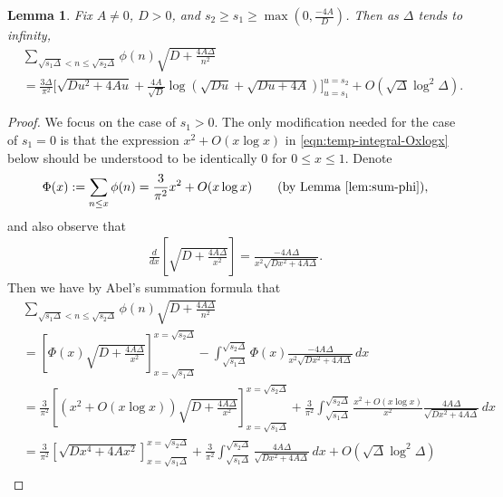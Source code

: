 \documentclass[11pt,letterpaper,reqno]{amsart}
\newtheorem{lemma}[theorem]{Lemma}
\numberwithin{equation}{section}
\numberwithin{figure}{section}
\numberwithin{table}{section}
\newcommand{\lrp}[1]{\left(#1\right)}
\newcommand{\lrb}[1]{\left[#1\right]}
\begin{document}
\begin{lemma}
    \label{lem:sum-phi-sqrt}
    Fix $A \ne 0$, $D > 0$, and $s_2 \ge s_1 \ge \max(0, \frac{-4A}{D})$. Then as $\Delta$ tends to infinity,
    \begin{align}
        &\sum_{ \sqrt{s_1 \Delta} < n \le \sqrt{s_2 \Delta} }
        \phi(n)  
        \sqrt{D+\frac{4A\Delta}{n^2}} \\
        &= \frac{3\Delta}{\pi^2}\Bigg[ \sqrt{Du^2+4Au} +  \frac{4A}{\sqrt D}
            \log\!\lrp{
                \sqrt{Du} + \sqrt{Du+4A}
            }
         \Bigg]_{u=s_1}^{u=s_2} + O\!\lrp{\sqrt{\Delta} \log^2 \Delta}.
    \end{align}
\end{lemma}
\begin{proof}  
    We focus on the case of $s_1 > 0$. The only modification needed for the case of $s_1 = 0$ is that the expression $x^2 + O(x\log x)$ in \eqref{eqn:temp-integral-Oxlogx} below should be understood to be identically $0$ for $0\le x \le 1$.
    Denote 
    \begin{align}
        \Phi(x) := \sum_{n \le x} \phi(n) = \frac{3}{\pi^2}x^2 + O(x\log x) \qquad \text{(by Lemma \ref{lem:sum-phi})},
    \end{align}
    and also observe that
    \begin{align}
        \frac{d}{dx}\lrb{\sqrt{D+\frac{4A\Delta}{x^2}}} =  \frac{-4A\Delta}{x^2\sqrt{Dx^2+4A\Delta}}.
    \end{align}
    Then we have by Abel's summation formula that
    \begin{align}
        &\sum_{\sqrt{s_1 \Delta} < n \le \sqrt{s_2 \Delta}} \phi(n)\sqrt{D+\frac{4A\Delta}{n^2}} \\
        &= \lrb{\Phi(x)\sqrt{D+\frac{4A\Delta}{x^2}}}_{x=\sqrt{s_1 \Delta}}^{x=\sqrt{s_2 \Delta}} - \int_{\sqrt{s_1 \Delta}}^{\sqrt{s_2 \Delta}} \Phi(x) 
        \frac{-4A\Delta}{x^2\sqrt{Dx^2+4A\Delta}}
        \,dx \\
        &= \frac{3}{\pi^2}\lrb{(x^2+O(x \log x))\sqrt{D+\frac{4A\Delta}{x^2}} }_{x=\sqrt{s_1 \Delta}}^{x=\sqrt{s_2 \Delta}} 
         + \frac{3}{\pi^2} \int_{\sqrt{s_1 \Delta}}^{\sqrt{s_2 \Delta}}  \frac{x^2 + O(x \log x)}{x^2} \frac{4A\Delta}{\sqrt{Dx^2+4A\Delta}} \,dx 
         \label{eqn:temp-integral-Oxlogx}\\
        &= \frac{3}{\pi^2}\lrb{\sqrt{Dx^4+4Ax^2}}_{x=\sqrt{s_1\Delta}}^{x=\sqrt{s_2\Delta}}  
         + \frac{3}{\pi^2} \int_{\sqrt{s_1 \Delta}}^{\sqrt{s_2 \Delta}}   \frac{4A\Delta}{\sqrt{Dx^2+4A\Delta}} \,dx + O\!\lrp{\sqrt{\Delta} \log^2 \Delta} \label{eqn:temp-integral-lemma-sum-phi-sqrt}\\

\end{align}
\end{proof}
\end{document}
